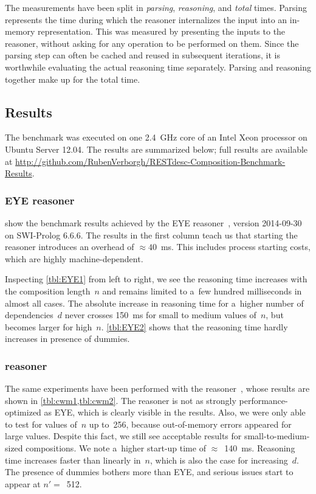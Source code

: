 The measurements have been split in
\emph{parsing}, \emph{reasoning}, and \emph{total} times.
Parsing represents the time during which the reasoner internalizes the input
into an in-memory representation.
This was measured by presenting the inputs to the reasoner,
without asking for any operation to be performed on them.
Since the parsing step can often be cached and reused in subsequent iterations,
it is worthwhile evaluating the actual reasoning time separately.
Parsing and reasoning together make up for the total time.

\subsection{Results}

The benchmark was executed on one 2.4~GHz core of an Intel Xeon processor
on Ubuntu Server 12.04.
The results are summarized below;
full results are available
at \url{http://github.com/RubenVerborgh/RESTdesc-Composition-Benchmark-Results}.

\subsubsection{EYE reasoner}
 show the benchmark results achieved by the EYE reasoner~\cite{eyepaper},
version 2014-09-30 on SWI-Prolog 6.6.6.
The results in the first column teach us that
starting the reasoner introduces an overhead of $\approx 40$~ms.
This includes process starting costs, which are highly machine-dependent.

Inspecting \cref{tbl:EYE1} from left to right,
we see the reasoning time increases with the composition length~$n$
and remains limited to a~few hundred milliseconds in almost all cases.
The absolute increase in reasoning time for a~higher number of dependencies~$d$
never crosses 150~ms for small to medium values of~$n$,
but becomes larger for high~$n$.
\cref{tbl:EYE2} shows that the reasoning time hardly increases in presence of dummies.

\vspace{-1em}

\subsubsection{\cwm reasoner}
The same experiments have been performed with the \cwm reasoner~\cite{cwm},
whose results are shown in \cref{tbl:cwm1,tbl:cwm2}.
The \cwm reasoner is not as strongly performance-optimized as EYE,
which is clearly visible in the results.
Also, we were only able to test for values of~$n$ up to~256,
because out-of-memory errors appeared for large values.
Despite this fact, we still see acceptable results for small-to-medium-sized compositions.
We note a~higher start-up time of $\approx$~140~ms.
Reasoning time increases faster than linearly in~$n$,
which is also the case for increasing~$d$.
The presence of dummies bothers \cwm more than EYE,
and serious issues start to appear at $n'=$~512.

